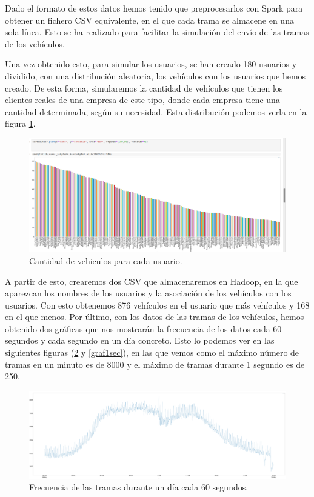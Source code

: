 Dado el formato de estos datos hemos tenido que preprocesarlos con Spark
para obtener un fichero CSV equivalente, en el que cada trama se almacene
en una sola línea. Esto se ha realizado para facilitar la simulación del
envío de las tramas de los vehículos.

Una vez obtenido esto, para simular los usuarios, se han creado 180
usuarios y dividido, con una distribución aleatoria, los vehículos con
los usuarios que hemos creado. De esta forma, simularemos la cantidad de
vehículos que tienen los clientes reales de una empresa de este tipo, donde
cada empresa tiene una cantidad determinada, según su necesidad. Esta
distribución podemos verla en la figura \ref{userGraf}.

\begin{figure}[htp]
\centering
\includegraphics[scale=0.3]{Imagenes/graf1.png}
\caption{Cantidad de vehiculos para cada usuario.}
\label{userGraf}
\end{figure}

A partir de esto, crearemos dos CSV que almacenaremos en Hadoop, en la que
aparezcan los nombres de los usuarios y la asociación de los vehículos con
los usuarios. Con esto obtenemos 876 vehículos en el usuario que más
vehículos y 168 en el que menos. Por último, con los datos de las tramas de los
vehículos, hemos obtenido dos gráficas que nos mostrarán la frecuencia de
los datos cada 60 segundos y cada segundo en un día concreto. Esto lo
podemos ver en las siguientes figuras (\ref{graf60sec} y \ref{graf1sec}),
en las que vemos como el máximo número de tramas en un minuto es de 8000 y
el máximo de tramas durante 1 segundo es de 250.

\begin{figure}[htp]
\centering
\includegraphics[scale=0.26]{Imagenes/graf2.png}
\caption{Frecuencia de las tramas durante un día cada 60 segundos.}
\label{graf60sec}
\end{figure}

